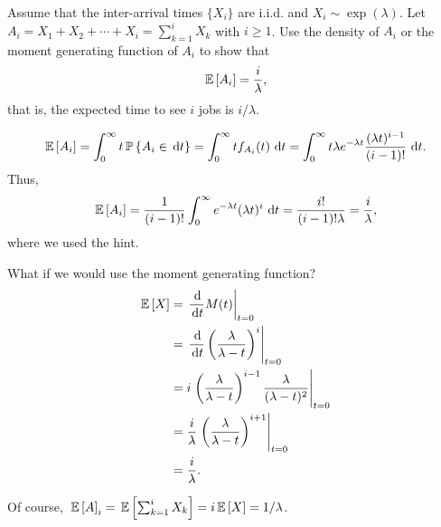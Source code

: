   \begin{question}
    Assume that the inter-arrival times $\{X_i\}$ are i.i.d. and
    $X_i\sim\exp(\lambda)$. Let
    $A_i=X_1+X_2+\cdots+X_i=\sum_{k=1}^i X_k$ with $i\geq 1$. Use the
    density of $A_i$ or the moment generating function of $A_i$ to
    show that
 \begin{equation*}
\,\mathbb{E}\left[A_i\right] = \frac i\lambda,
 \end{equation*}
 that is, the expected time to see $i$ jobs is $i/\lambda$.
  \begin{solution}
  \begin{equation*}
\,\mathbb{E}\left[A_i\right] = \int_0^\infty t \,\mathbb{P}\left\{A_i \in \,\text{d}t\right\} = \int_0^\infty t f_{A_i} (t) \, \,\text{d}t  = 
\int_0^\infty t  \lambda e^{-\lambda t} \frac{(\lambda t)^{i-1}}{(i-1)!}\, \,\text{d}t.
  \end{equation*}
Thus, 
  \begin{equation*}
\,\mathbb{E}\left[A_i\right] = \frac{1}{(i-1)!} \int_0^\infty   e^{-\lambda t} (\lambda t)^i\,\,\text{d}t = \frac{i!}{(i-1)!\lambda}=\frac{i}\lambda,
  \end{equation*}
  where we used the hint.

What if we would use the moment generating function? 
\begin{equation*}
  \begin{split}
    \E{X} 
&= \left.\frac{\d}{\d t} M(t)\right|_{t=0} \\
&= \left.\frac{\d}{\d t} \left(\frac{\lambda}{\lambda-t}\right)^i\right|_{t=0} \\
&= i \left.\left(\frac{\lambda}{\lambda-t}\right)^{i-1}\frac{\lambda}{(\lambda-t)^2}\right|_{t=0} \\
&= \frac i\lambda \left.\left(\frac{\lambda}{\lambda-t}\right)^{i+1}\right|_{t=0} \\
&= \frac i\lambda.
  \end{split}
\end{equation*}

Of course, $\,\mathbb{E}\left[A\right]_i = \,\mathbb{E}\left[\sum_{k=1}^i X_k\right] = i \,\mathbb{E}\left[X\right] = 1/\lambda$. 
  \end{solution}
\end{question}


